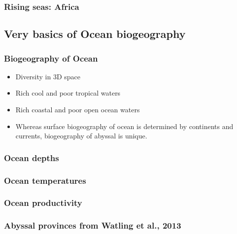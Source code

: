 \documentclass{beamer}
\newcommand{\Max}[1]{\texttt{[image: \#1]}}
\begin{document}

\begin{frame}
\frametitle{Rising seas: Africa}
\centering
\end{frame}


\subsection{Very basics of Ocean biogeography}


\begin{frame}
\frametitle{Biogeography of Ocean}

\begin{itemize}

\item Diversity in 3D space

\item Rich cool and poor tropical waters

\item Rich coastal and poor open ocean waters

\item Whereas surface biogeography of ocean is determined by continents and currents, biogeography of abyssal is unique.

\end{itemize}

\end{frame}


\begin{frame}
\frametitle{Ocean depths}
\centering
\end{frame}


\begin{frame}
\frametitle{Ocean temperatures}
\centering
\end{frame}


\begin{frame}
\frametitle{Ocean productivity}
\centering
\end{frame}


\begin{frame}
\frametitle{Abyssal provinces from Watling et al., 2013}
\centering
\end{frame}
\end{document}
